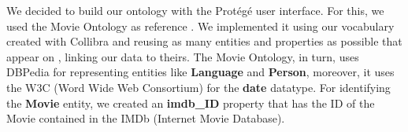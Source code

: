We decided to build our ontology with the Protégé user interface. For this, we used the Movie Ontology as reference 
\cite{movieontology}. We implemented it using our vocabulary created with Collibra and reusing as many entities and 
properties as possible that appear on \cite{movieontology}, linking our data to theirs. The Movie Ontology, in turn, 
uses DBPedia \cite{dbpedia} for representing entities like \textbf{Language} and \textbf{Person}, moreover, it uses 
the W3C (Word Wide Web Consortium) \cite{w3c} for the \textbf{date} datatype. For identifying the \textbf{Movie} entity, we created an \textbf{imdb\_ID} property that has the ID of the Movie contained in the IMDb (Internet Movie Database).
